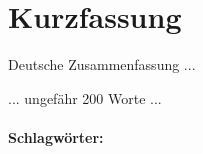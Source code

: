 \section*{Kurzfassung}
\vspace{0.5cm}

Deutsche Zusammenfassung ...

... ungefähr 200 Worte ...

\paragraph{Schlagwörter:}
